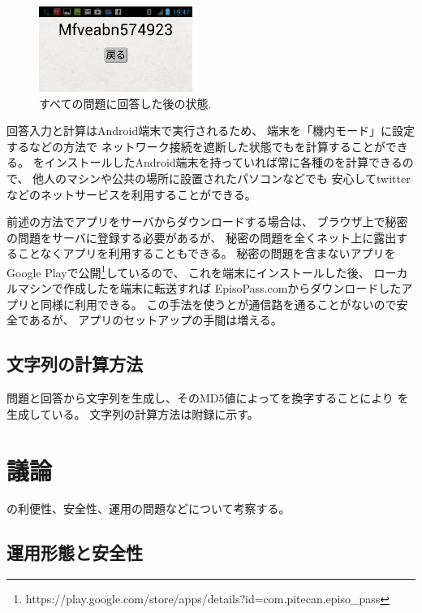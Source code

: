 \documentclass[twoside]{wiss}
\begin{document}
\begin{figure}[H]
\centerline{\includegraphics[width=50mm,bb=0 0 720 400]{figures/android3crop.png}}
\caption{すべての問題に回答した後の状態.}
\label{android3}
\end{figure}

回答入力と{\PW}計算はAndroid端末で実行されるため、
端末を「機内モード」に設定するなどの方法で
ネットワーク接続を遮断した状態でも{\PW}を計算することができる。
{\EP}をインストールしたAndroid端末を持っていれば常に各種の{\PW}を計算できるので、
他人のマシンや公共の場所に設置されたパソコンなどでも
安心してtwitterなどのネットサービスを利用することができる。

前述の方法で{\EP}アプリをサーバからダウンロードする場合は、
ブラウザ上で秘密の問題をサーバに登録する必要があるが、
秘密の問題を全くネット上に露出することなくアプリを利用することもできる。
秘密の問題を含まない{\EP}アプリをGoogle Playで公開\footnote{
 {\textsf{https://play.google.com/{\allowbreak}store/{\allowbreak}apps/{\allowbreak}details?{\allowbreak}id=com.{\allowbreak}pitecan.{\allowbreak}episo\_pass}}
}しているので、
これを端末にインストールした後、
ローカルマシンで作成した{\SQ}を端末に転送すれば
\textsf{EpisoPass.comから}ダウンロードしたアプリと同様に利用できる。
この手法を使うと{\SQ}が通信路を通ることがないので安全であるが、
アプリのセットアップの手間は増える。

\subsection{{\PW}文字列の計算方法}

問題と回答から文字列を生成し、そのMD5値によって{\SS}を換字することにより
{\PW}を生成している。
{\PW}文字列の計算方法は附録に示す。

\section{議論}

{\EP}の利便性、安全性、運用の問題などについて考察する。

\subsection{運用形態と安全性}
\end{document}
